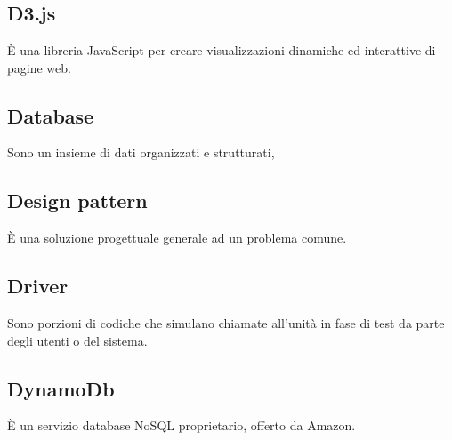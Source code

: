\section{}
\subsection*{D3.js} È una libreria JavaScript per creare visualizzazioni dinamiche ed interattive di pagine web.

\subsection*{Database} Sono un insieme di dati organizzati e strutturati,

\subsection*{Design pattern} È una soluzione progettuale generale ad un problema comune.

\subsection*{Driver} Sono porzioni di codiche che simulano chiamate all'unità in fase di test da parte degli utenti o del sistema.

\subsection*{DynamoDb} È un servizio database NoSQL proprietario, offerto da Amazon.

\newpage